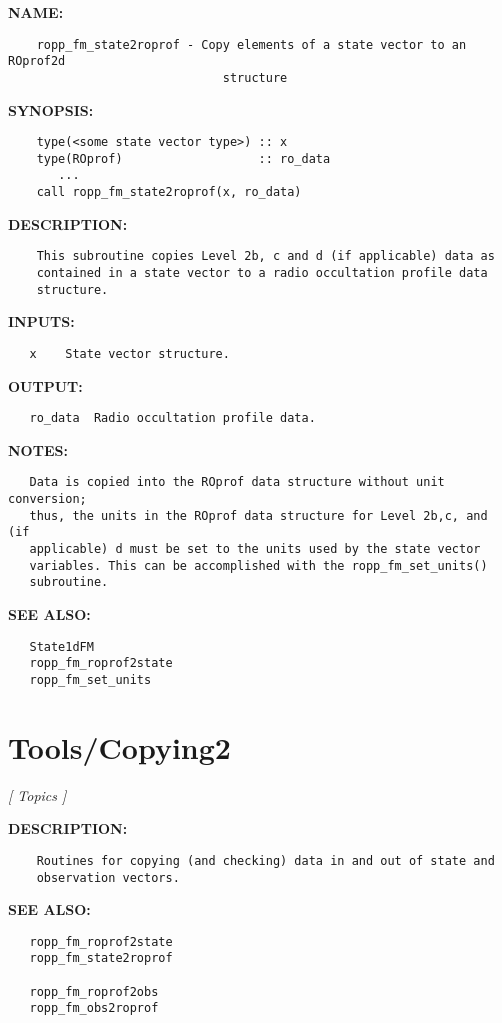 \label{ch:robo34}
\label{ch:Copying_ropp_fm_state2d2roprof}
\textbf{NAME:}\hspace{0.08in}\begin{Verbatim}
    ropp_fm_state2roprof - Copy elements of a state vector to an ROprof2d
                              structure
\end{Verbatim}
\textbf{SYNOPSIS:}\hspace{0.08in}\begin{Verbatim}
    type(<some state vector type>) :: x 
    type(ROprof)                   :: ro_data
       ...
    call ropp_fm_state2roprof(x, ro_data)
\end{Verbatim}
\textbf{DESCRIPTION:}\hspace{0.08in}\begin{Verbatim}
    This subroutine copies Level 2b, c and d (if applicable) data as
    contained in a state vector to a radio occultation profile data
    structure.
\end{Verbatim}
\textbf{INPUTS:}\hspace{0.08in}\begin{Verbatim}
   x    State vector structure.
\end{Verbatim}
\textbf{OUTPUT:}\hspace{0.08in}\begin{Verbatim}
   ro_data  Radio occultation profile data.
\end{Verbatim}
\textbf{NOTES:}\hspace{0.08in}\begin{Verbatim}
   Data is copied into the ROprof data structure without unit conversion; 
   thus, the units in the ROprof data structure for Level 2b,c, and (if
   applicable) d must be set to the units used by the state vector
   variables. This can be accomplished with the ropp_fm_set_units()
   subroutine.
\end{Verbatim}
\textbf{SEE ALSO:}\hspace{0.08in}\begin{Verbatim}
   State1dFM
   ropp_fm_roprof2state
   ropp_fm_set_units
\end{Verbatim}
\section{Tools/Copying2}
\textsl{[ Topics ]}

\label{ch:robo88}
\label{ch:Tools_Copying2}
\textbf{DESCRIPTION:}\hspace{0.08in}\begin{Verbatim}
    Routines for copying (and checking) data in and out of state and
    observation vectors.
\end{Verbatim}
\textbf{SEE ALSO:}\hspace{0.08in}\begin{Verbatim}
   ropp_fm_roprof2state
   ropp_fm_state2roprof

   ropp_fm_roprof2obs
   ropp_fm_obs2roprof
\end{Verbatim}
